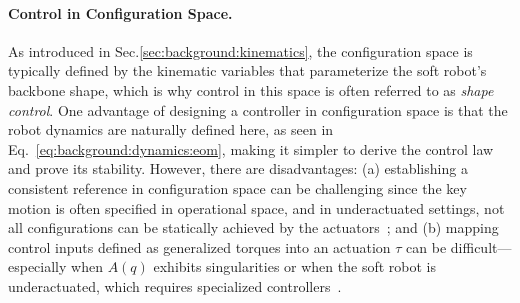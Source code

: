 \paragraph{Control in Configuration Space.}
As introduced in Sec.\ref{sec:background:kinematics}, the configuration space is typically defined by the kinematic variables that parameterize the soft robot’s backbone shape, which is why control in this space is often referred to as \emph{shape control}. One advantage of designing a controller in configuration space is that the robot dynamics are naturally defined here, as seen in Eq.~\ref{eq:background:dynamics:eom}, making it simpler to derive the control law and prove its stability. However, there are disadvantages: (a) establishing a consistent reference in configuration space can be challenging since the key motion is often specified in operational space, and in underactuated settings, not all configurations can be statically achieved by the actuators~\citep{della2025pushing}; and (b) mapping control inputs defined as generalized torques into an actuation $\tau$ can be difficult—especially when $A(q)$ exhibits singularities or when the soft robot is underactuated, which requires specialized controllers~\citep{pustina2022feedback}.


